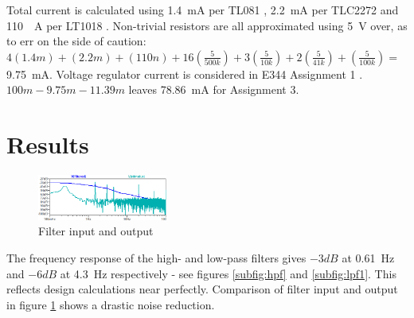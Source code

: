 Total current is calculated using \SI{1.4}{mA} per TL081 \cite{tl081}, \SI{2.2}{mA} per TLC2272 \cite{tlc2272} and \SI{110}{\mu A} per LT1018 \cite{lt1018}. Non-trivial resistors are all approximated using \SI{5}{V} over, as to err on the side of caution: $4(1.4m) + (2.2m) + (110n) + 16\left(\frac{5}{500k}\right) + 3\left(\frac{5}{10k}\right) +
 2\left(\frac{5}{41k}\right) + \left(\frac{5}{100k}\right) =$ \SI{9.75}{mA}. Voltage regulator current is considered in E344 Assignment 1 \cite{prev}. $100m - 9.75m - 11.39m$ leaves \SI{78.86}{mA} for Assignment 3.

\section{Results} \label{sec:heartResults}

\begin{figure}
\centering
\vspace{-.8cm}
\includegraphics[width=0.38\textwidth]{./Figures/filtout}
\caption{Filter input and output}
\label{fig:filtout}
\end{figure}

The frequency response of the high- and low-pass filters gives $-3dB$ at \SI{0.61}{Hz} and $-6dB$ at \SI{4.3}{Hz} respectively - see figures \ref{subfig:hpf} and \ref{subfig:lpf1}. This reflects design calculations near perfectly. Comparison of filter input and output in figure \ref{fig:filtout} shows a drastic noise reduction.
\pagebreak

